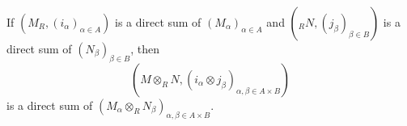 If $(M_R, (i_\alpha)_{\alpha \in A})$ is a direct sum of $(M_\alpha)_{\alpha \in A}$ and $({}_R N, (j_\beta)_{\beta \in B})$ is a direct sum of $(N_\beta)_{\beta \in B}$, then
$$(M \otimes_R N, (i_\alpha \otimes j_\beta)_{\alpha, \beta \in A \times B})$$
is a direct sum of $(M_\alpha \otimes_R N_\beta)_{\alpha, \beta \in A \times B}$.
